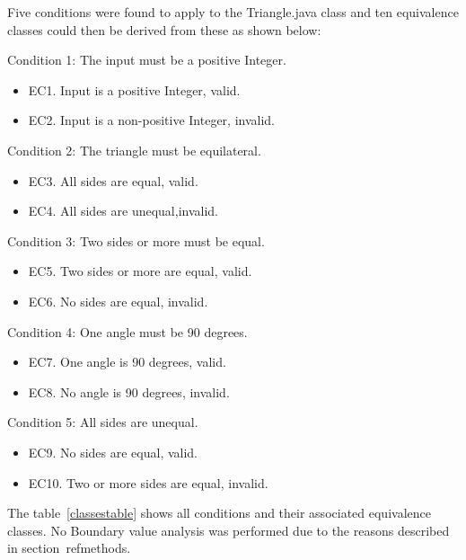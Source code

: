 Five conditions were found to apply to the Triangle.java class and ten equivalence classes could then be derived from these as shown below:

\noindent Condition 1: The input must be a positive Integer.
\begin{itemize}
	\item EC1. Input is a positive Integer, valid.
	\item EC2. Input is a non-positive Integer, invalid.
\end{itemize}

\noindent Condition 2: The triangle must be equilateral.
\begin{itemize}
	\item EC3. All sides are equal, valid. 
	\item EC4. All sides are unequal,invalid. 
\end{itemize}

\noindent Condition 3: Two sides or more must be equal.  
\begin{itemize}
	\item EC5. Two sides or more are equal, valid. 
	\item EC6. No sides are equal, invalid. 
\end{itemize}

\noindent Condition 4: One angle must be 90 degrees. 
\begin{itemize}
	\item EC7. One angle is 90 degrees, valid. 
	\item EC8. No angle is 90 degrees, invalid. 
\end{itemize}

\noindent Condition 5: All sides are unequal. 
\begin{itemize}
	\item EC9. No sides are equal, valid. 
	\item EC10. Two or more sides are equal, invalid. 
\end{itemize}

The table~\ref{classestable} shows all conditions and their associated equivalence classes. No Boundary value analysis was performed due to the reasons described in section~ref{methods}. 


